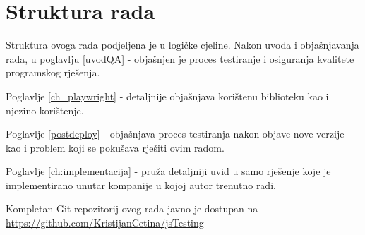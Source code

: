 \section*{Struktura rada}
Struktura ovoga rada podjeljena je u logičke cjeline.
Nakon uvoda i objašnjavanja rada, u poglavlju \ref{uvodQA} -  objašnjen je proces testiranje i osiguranja kvalitete programskog rješenja.

Poglavlje \ref{ch_playwright} -  detaljnije objašnjava korištenu biblioteku kao i njezino korištenje.

Poglavlje \ref{postdeploy} -  objašnjava proces testiranja nakon objave nove verzije kao i problem koji se pokušava rješiti ovim radom.

Poglavlje \ref{ch:implementacija} -  pruža detaljniji uvid u samo rješenje koje je implementirano unutar kompanije u kojoj autor trenutno radi.

Kompletan Git repozitorij ovog rada javno je dostupan na \url{https://github.com/KristijanCetina/jsTesting}